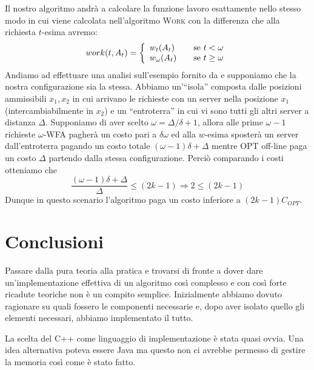 \documentclass[a4paper, 10pt]{article}
\begin{document}
Il nostro algoritmo andrà a calcolare la funzione lavoro esattamente nello 
stesso modo in cui viene calcolata nell'algoritmo \textsc{Work} con la 
differenza che alla richiesta $t$-esima avremo:
\[
    work(t, A_t) = 
    \left\{ \begin{array}{l l}
        w_t(A_t) & \quad \text{se } t < \omega\\
        w_\omega(A_t) & \quad \text{se } t \geq \omega \\
    \end{array}\right.
\]
Andiamo ad effettuare una analisi sull'esempio fornito
da \cite{rudec} e supponiamo che la nostra configurazione sia la stessa. Abbiamo un'``isola'' composta dalle posizioni ammissibili $x_1, x_2$ in cui arrivano le 
richieste con un server nella posizione $x_1$ (intercambiabilmente in $x_2$) 
e un ``entroterra'' in cui vi sono tutti gli altri server a distanza $\Delta$. 
Supponiamo di aver scelto $\omega = \Delta / \delta + 1$, allora alle prime 
$\omega - 1$ richieste $\omega$-WFA pagherà un costo pari a $\delta \omega$ ed
 alla $w$-esima sposterà un server dall'entroterra pagando un costo totale 
$(\omega - 1)\delta + \Delta$ mentre OPT off-line paga un costo $\Delta$ 
partendo dalla stessa configurazione. Perciò comparando i costi otteniamo che 
\[
    \frac{(\omega - 1) \delta + \Delta}{\Delta} \leq (2k -1) \Rightarrow 
    2  \leq (2k - 1)
\]
Dunque in questo scenario l'algoritmo paga un costo inferiore a $(2k - 1)C_{OPT}$. 

\section{Conclusioni}
Passare dalla pura teoria alla pratica e trovarsi di fronte a dover dare un'implementazione 
effettiva di un algoritmo così complesso e con così forte ricadute teoriche 
non è un compito semplice. Inizialmente abbiamo dovuto ragionare su quali 
fossero le componenti necessarie e, dopo aver isolato quello gli elementi necessari, abbiamo implementato il tutto.

La scelta del C++ come linguaggio di implementazione è stata quasi ovvia. Una 
idea alternativa poteva essere Java ma questo non ci avrebbe permesso di 
gestire la memoria così come è stato fatto.  



\end{document}

